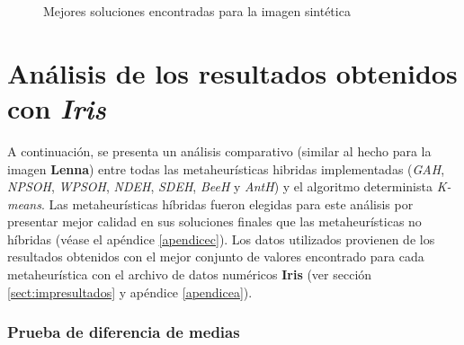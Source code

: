 \begin{figure}[h!]
  \caption{Mejores soluciones encontradas para la imagen sintética}
  \label{fig:trivialresults}
\end{figure}

\section{Análisis de los resultados obtenidos con \emph{Iris}}\label{sect:arcsv}

    A continuación, se presenta un análisis comparativo (similar al hecho para la
imagen \textbf{Lenna}) entre todas las metaheurísticas hibridas implementadas
(\emph{GAH}, \emph{NPSOH}, \emph{WPSOH}, \emph{NDEH}, \emph{SDEH}, \emph{BeeH} y
\emph{AntH}) y el algoritmo determinista \emph{K-means}. Las metaheurísticas
híbridas fueron elegidas para este análisis por presentar mejor calidad en sus
soluciones finales que las metaheurísticas no híbridas (véase el apéndice
\ref{apendicec}).
    Los datos utilizados provienen de los resultados obtenidos con el mejor
conjunto de valores encontrado para cada metaheurística con el archivo de datos
numéricos \textbf{Iris} (ver sección \ref{sect:impresultados} y apéndice
\ref{apendicea}).

\subsubsection{Prueba de diferencia de medias}\label{analisis:db_mean_hip_csv}

